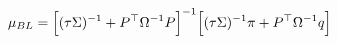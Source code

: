 \documentclass[preview]{standalone}
\begin{document}
\begin{align*}
\special{dvisvgm:raw <g id='unique000'>}\mu_{BL} = \Bigl[(\tau\Sigma)^{-1} + P^\top\Omega^{-1}P\Bigr]^{-1}\Bigl[(\tau\Sigma)^{-1}\pi + P^\top\Omega^{-1}q\Bigr]\special{dvisvgm:raw </g>}
\end{align*}
\end{document}
